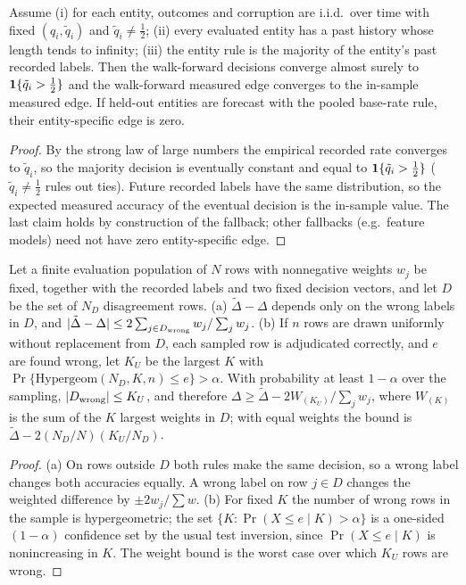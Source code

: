 \begin{proposition}\label{prop:appwf}
Assume (i) for each entity, outcomes and corruption are i.i.d.\ over time with fixed $(q_i,\tilde q_i)$ and $\tilde q_i\neq\tfrac12$; (ii) every evaluated entity has a past history whose length tends to infinity; (iii) the entity rule is the majority of the entity's past recorded labels. Then the walk-forward decisions converge almost surely to $\mathbf{1}\{\tilde q_i>\tfrac12\}$ and the walk-forward measured edge converges to the in-sample measured edge. If held-out entities are forecast with the pooled base-rate rule, their entity-specific edge is zero.
\end{proposition}
\begin{proof}
By the strong law of large numbers the empirical recorded rate converges to $\tilde q_i$, so the majority decision is eventually constant and equal to $\mathbf{1}\{\tilde q_i>\tfrac12\}$ ($\tilde q_i\ne\tfrac12$ rules out ties). Future recorded labels have the same distribution, so the expected measured accuracy of the eventual decision is the in-sample value. The last claim holds by construction of the fallback; other fallbacks (e.g.\ feature models) need not have zero entity-specific edge.
\end{proof}
\begin{proposition}\label{prop:appaudit}
Let a finite evaluation population of $N$ rows with nonnegative weights $w_j$ be fixed, together with the recorded labels and two fixed decision vectors, and let $D$ be the set of $N_D$ disagreement rows. (a) $\tilde\Delta-\Delta$ depends only on the wrong labels in $D$, and $|\tilde\Delta-\Delta|\le2\sum_{j\in D_{\rm wrong}}w_j/\sum_jw_j$. (b) If $n$ rows are drawn uniformly without replacement from $D$, each sampled row is adjudicated correctly, and $e$ are found wrong, let $K_U$ be the largest $K$ with $\Pr\{\mathrm{Hypergeom}(N_D,K,n)\le e\}>\alpha$. With probability at least $1-\alpha$ over the sampling, $|D_{\rm wrong}|\le K_U$, and therefore $\Delta\ge\tilde\Delta-2W_{(K_U)}/\sum_jw_j$, where $W_{(K)}$ is the sum of the $K$ largest weights in $D$; with equal weights the bound is $\tilde\Delta-2(N_D/N)(K_U/N_D)$.
\end{proposition}
\begin{proof}
(a) On rows outside $D$ both rules make the same decision, so a wrong label changes both accuracies equally. A wrong label on row $j\in D$ changes the weighted difference by $\pm2w_j/\sum w$. (b) For fixed $K$ the number of wrong rows in the sample is hypergeometric; the set $\{K:\Pr(X\le e\mid K)>\alpha\}$ is a one-sided $(1-\alpha)$ confidence set by the usual test inversion, since $\Pr(X\le e\mid K)$ is nonincreasing in $K$. The weight bound is the worst case over which $K_U$ rows are wrong.
\end{proof}
